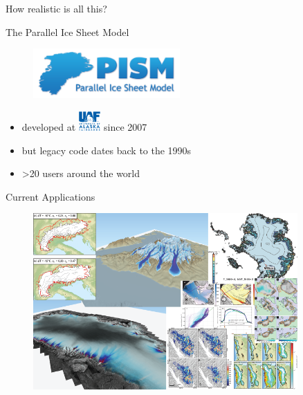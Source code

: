 \documentclass[hide notes,intlimits]{beamer}
\begin{document}
\begin{frame}{How realistic is all this?}
\end{frame}



  {
} 

\begin{frame}{The Parallel Ice Sheet Model}
  \begin{figure}
    \includegraphics[width=0.5\textwidth]{pism-logo}
  \end{figure}
  \begin{itemize}
  \item developed at \includegraphics[height=0.75cm]{logo_uaf} since 2007
  \item but legacy code dates back to the 1990s
  \item >20 users around the world
  \end{itemize}
\end{frame}

\begin{frame}{Current Applications}
  \begin{figure}
    \includegraphics[width=0.9\textwidth]{pism-applications-composite-01}
  \end{figure}

\end{frame}
\end{document}
